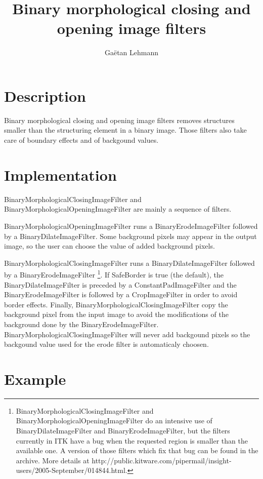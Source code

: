 \documentclass[IJ]{cesj}
\author{Ga\"etan Lehmann}
\institute{Biologie du d\'eveloppement et de la reproduction, INRA de Jouy-en-Josas}
\title{Binary morphological closing and opening image filters}
\begin{document}
\lstset{language=c++}
\maketitle

\section{Description}
Binary morphological closing and opening image filters removes structures smaller than the structuring element in a binary image. Those filters also take care of boundary effects and of backgound values.

\section{Implementation}
BinaryMorphologicalClosingImageFilter and BinaryMorphologicalOpeningImageFilter are mainly a sequence of filters.

BinaryMorphologicalOpeningImageFilter runs a BinaryErodeImageFilter followed by a BinaryDilateImageFilter. Some background pixels may appear in the output image, so the user can choose the value of added background pixels.

BinaryMorphologicalClosingImageFilter runs a BinaryDilateImageFilter followed by a BinaryErodeImageFilter \footnote{BinaryMorphologicalClosingImageFilter and BinaryMorphologicalOpeningImageFilter do an intensive use of BinaryDilateImageFilter and BinaryErodeImageFilter, but the filters currently in ITK have a bug when the requested region is smaller than the available one. A version of those filters which fix that bug can be found in the archive. More details at http://public.kitware.com/pipermail/insight-users/2005-September/014844.html.}. If SafeBorder is true (the default), the BinaryDilateImageFilter is preceded by a ConstantPadImageFilter and the BinaryErodeImageFilter is followed by a CropImageFilter in order to avoid border effects. Finally, BinaryMorphologicalClosingImageFilter copy the background pixel from the input image to avoid the modifications of the background done by the BinaryErodeImageFilter. BinaryMorphologicalClosingImageFilter will never add backgound pixels so the backgound value used for the erode filter is automaticaly choosen. 
\section{Example}
\end{document}

